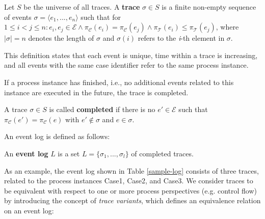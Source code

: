 \documentclass[runningheads]{llncs}
\begin{document}
\begin{definition}
Let $S$ be the universe of all traces. A \textbf{trace} $\sigma \in S$ is a finite non-empty sequence of events $\sigma = \langle e_1, ..., e_{n} \rangle$ such that for $1 \leq i < j \leq n: e_i, e_j \in \mathcal{E} \wedge \pi_{\mathcal{C}}(e_i) = \pi_{\mathcal{C}}(e_j) \wedge \pi_{\mathcal{T}}(e_i) \leq \pi_{\mathcal{T}}(e_j)$, where $|\sigma| = n$ denotes the length of $\sigma$ and $\sigma(i)$ refers to the \textit{i}-th element in $\sigma$. 
\end{definition}
This definition states that each event is unique, time within a trace is increasing, and all events with the same case identifier refer to the same process instance. 

If a process instance has finished, i.e., no additional events related to this instance are executed in the future, the trace is completed. 
\begin{definition}
	A trace $\sigma \in S$ is called \textbf{completed} if there is no $e' \in \mathcal{E}$ such that $\pi_{\mathcal{C}}(e') = \pi_{\mathcal{C}}(e)$ with $e' \notin \sigma$ and $e \in \sigma$. 
\end{definition}
An event log is defined as follows:
\begin{definition}
An \textbf{event log} $L$ is a set $L = \{\sigma_{1}, ..., \sigma_{l}\}$ of completed traces.
\end{definition}
As an example, the event log shown in Table \ref{sample-log} consists of three traces, related to the process instances Case1, Case2, and Case3. We consider traces to be equivalent with respect to one or more process perspectives (e.g. control flow) by introducing the concept of \textit{trace variants}, which defines an equivalence relation on an event log:
\end{document}
